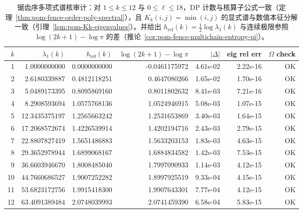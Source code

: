 \begin{table}[H]
\centering
\scriptsize
\setlength{\tabcolsep}{6pt}
\caption{锯齿序多项式谱核审计：对 $1\le k\le 12$ 与 $0\le \ell\le 18$，DP 计数与核算子公式一致（定理~\ref{thm:pom-fence-order-poly-spectral}），且 $K_k(i,j)=\min(i,j)$ 的显式谱与数值本征分解一致（引理~\ref{lem:pom-Kk-eigenvalues}）。并给出 $h_{\mathrm{ref}}(k)=\tfrac12\log\lambda_1(k)$ 与连续极限参照 $\log(2k+1)-\log\pi$ 的差（推论~\ref{cor:pom-fence-multichain-entropy-pi}）。}
\label{tab:fence_order_poly_spectral_audit}
\begin{tabular}{r r r r r r r}
\toprule
$k$ & $\lambda_1(k)$ & $h_{\mathrm{ref}}(k)$ & $\log(2k+1)-\log\pi$ & $|\Delta|$ & eig rel err & $\Omega$ check\\
\midrule
1 & 1.0000000000 & 0.0000000000 & -0.0461175972 & 4.61e-02 & 2.22e-16 & OK\\
2 & 2.6180339887 & 0.4812118251 & 0.4647080266 & 1.65e-02 & 1.70e-16 & OK\\
3 & 5.0489173395 & 0.8095869160 & 0.8011802632 & 8.41e-03 & 7.21e-16 & OK\\
4 & 8.2908593694 & 1.0575768136 & 1.0524946915 & 5.08e-03 & 1.07e-15 & OK\\
5 & 12.3435375197 & 1.2565663242 & 1.2531653869 & 3.40e-03 & 1.64e-15 & OK\\
6 & 17.2068572674 & 1.4226539914 & 1.4202194716 & 2.43e-03 & 2.79e-15 & OK\\
7 & 22.8807827419 & 1.5651486883 & 1.5633203153 & 1.83e-03 & 4.63e-15 & OK\\
8 & 29.3652978944 & 1.6899068167 & 1.6884834582 & 1.42e-03 & 7.53e-15 & OK\\
9 & 36.6603946670 & 1.8008485040 & 1.7997090933 & 1.14e-03 & 4.12e-15 & OK\\
10 & 44.7660686527 & 1.9007252282 & 1.8997925519 & 9.33e-04 & 4.15e-15 & OK\\
11 & 53.6823172756 & 1.9915418300 & 1.9907643301 & 7.77e-04 & 4.12e-15 & OK\\
12 & 63.4091389484 & 2.0748039993 & 2.0741459390 & 6.58e-04 & 5.83e-15 & OK\\
\bottomrule
\end{tabular}
\end{table}
